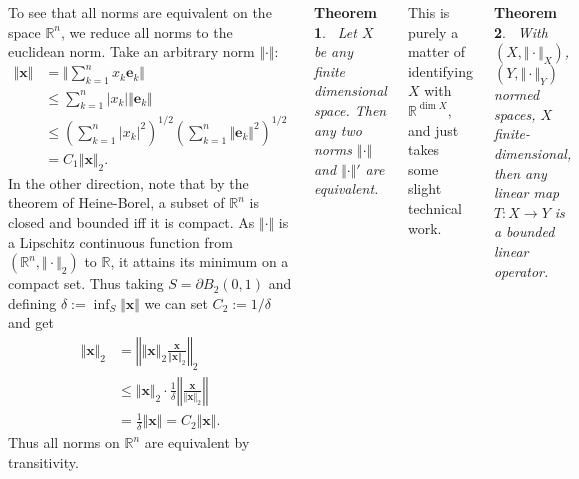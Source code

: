 \documentclass{tikzposter} %
\newtheorem{theorem}{Theorem}
\begin{document}
\begin{columns}
{    To see that all norms are equivalent on the space $\mathbb{R}^{n}$, we reduce all norms to the euclidean norm. Take an arbitrary norm $\Vert \cdot \Vert$:
    \begin{align*}
      \Vert \bm{x} \Vert &= \Vert \sum_{k=1}^{n} x_{k} \bm{e}_{k} \Vert \\
                         &\le \sum_{k=1}^{n} |x_{k}| \Vert \bm{e}_{k} \Vert \\
                         &\le \left(\sum_{k=1}^{n} |x_{k}|^{2} \right)^{1/2} \left(\sum_{k=1}^{n} \Vert \bm{e}_{k} \Vert^{2}\right)^{1/2} \\
      &= C_{1}\Vert \bm{x} \Vert_{2}.
    \end{align*}
    In the other direction, note that by the theorem of Heine-Borel, a subset of $\mathbb{R}^{n}$ is closed and bounded iff it is compact. As $\Vert \cdot \Vert$ is a Lipschitz continuous function from $(\mathbb{R}^{n}, \Vert \cdot \Vert_{2})$ to $\mathbb{R}$, it attains its minimum on a compact set. Thus taking $S = \partial B_{2}(0,1)$ and defining $\delta := \inf_{S} \Vert \bm{x} \Vert$ we can set $C_{2} := 1/\delta$ and get
    \begin{align*}
      \Vert \bm{x} \Vert_{2} &= \left\Vert \Vert \bm{x} \Vert_{2} \frac{\bm{x}}{\Vert \bm{x} \Vert_{2}} \right\Vert_{2} \\
                             &\le \Vert \bm{x} \Vert_{2} \cdot \frac{1}{\delta} \left\Vert \frac{\bm{x}}{\Vert \bm{x} \Vert_{2}} \right\Vert \\
      &= \frac{1}{\delta} \Vert \bm{x} \Vert = C_{2}\Vert \bm{x} \Vert.
    \end{align*}
    Thus all norms on $\mathbb{R}^{n}$ are equivalent by transitivity. \\

    \begin{theorem}
    \ Let $X$ be any finite dimensional space. Then any two norms $\Vert \cdot \Vert$ and $\Vert \cdot \Vert'$ are equivalent.
    \end{theorem}
    \hphantom{}

    This is purely a matter of identifying $X$ with $\mathbb{R}^{\dim X}$, and just takes some slight technical work. \\

    \begin{theorem}
    \ With $(X, \Vert \cdot \Vert_{X})$, $(Y, \Vert \cdot \Vert_{Y})$ normed spaces, $X$ finite-dimensional, then any linear map $T : X \to Y$ is a bounded linear operator.
    \end{theorem}
    \hphantom{}

}
\end{columns}
\end{document}
